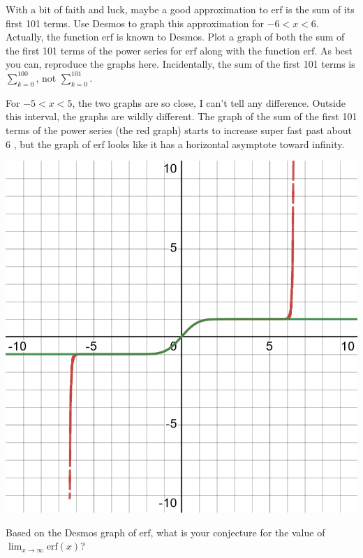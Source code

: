 \documentclass[12pt,fleqn,answers]{exam}
\newcommand{\erf}{\mathrm{erf}}
\begin{document}
\begin{questions}
\newpage

\question [1]  With a bit of faith and luck, maybe a good approximation to $\erf$ is the sum of its first 101 terms.
Use Desmos to graph this approximation for $-6 < x < 6$.   Actually, the function $\erf$ is known to Desmos. Plot
a graph of both the sum of the first 101 terms of the power series for $\erf$ along with the function $\erf$.
As best you can, reproduce the graphs here.  Incidentally, the sum of the first 101 terms is $\displaystyle \sum_{k=0}^{100}$,
not $\displaystyle \sum_{k=0}^{101}$.


\begin{solution}[1.5in]
For $-5 < x < 5$, the two graphs are so close, I can't tell any difference. Outside this interval, the graphs are wildly different.
The graph of the sum of the first 101 terms of the power series (the red graph) starts to increase super fast past about 6
, but the graph of $\erf$ looks like it has a horizontal asymptote toward infinity.

\includegraphics[scale=0.2]{desmos-graph(67).png}

\end{solution}


\question [1] Based on the Desmos graph of $\erf$, what is your conjecture for the value of $\displaystyle \lim_{x \to \infty} \erf(x)$? 



\end{questions}
\end{document}
